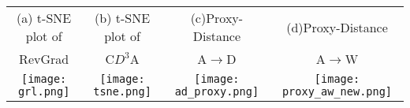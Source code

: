 \documentclass{bmvc2k}
\begin{document}
\begin{figure*}[!]
     \small
     \centering
     \begin{tabular}[b]{ c  c c c  }
     (a) t-SNE plot of &  (b) t-SNE plot of & (c)Proxy-Distance &  (d)Proxy-Distance    \\ RevGrad &  C$D^{3}$A &   A$\rightarrow$D &  A$\rightarrow$W  \\ 
     \texttt{[image: grl.png]}
     & \texttt{[image: tsne.png]}
     & \texttt{[image: ad\_proxy.png]}
     & \texttt{[image: proxy\_aw\_new.png]}
       \end{tabular}
\caption{(a) and (b) figures show t-SNE visualizations of the CNN's activation (a) in case when adapted through\cite{ganin_ICML2015} and (b) when adapted through proposed model. Blue and red points correspond to the source domain(A), and the target domain (W) respectively. Sub figures (c) and (d) show the proxy distance for A$\rightarrow$D and A$\rightarrow$W.}
      \label{tbl:tSNE}


 \end{figure*}
\end{document}
